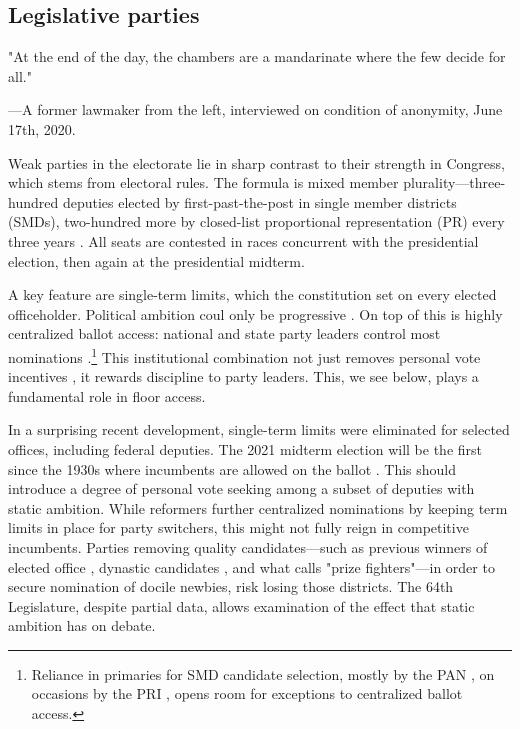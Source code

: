 \documentclass[letter,12pt]{article}
\begin{document}

\subsection{Legislative parties}
\epigraph{\singlespacing "At the end of the day, the chambers are a mandarinate where the few decide for all."}%
{\singlespacing---A former lawmaker from the left, interviewed on condition of anonymity, June 17th, 2020.}

Weak parties in the electorate lie in sharp contrast to their strength in Congress, which stems from electoral rules. The formula is mixed member plurality---three-hundred deputies elected by first-past-the-post in single member districts (SMDs), two-hundred more by closed-list proportional representation (PR) every three years \citep{weldonMixedMemberSys2001}. All seats are contested in races concurrent with the presidential election, then again at the presidential midterm.

A key feature are single-term limits, which the constitution set on every elected officeholder. Political ambition coul only be progressive \citep{schlesinger.1966}. On top of this is highly centralized ballot access: national and state party leaders control most nominations \citep{rosas.langston.2011,langston.2008}.\footnote{Reliance in primaries for SMD candidate selection, mostly by the PAN \citep{ascencio.kerevel.cand-sel-beh.2021}, on occasions by the PRI \citep{poire.phd.2002}, opens room for exceptions to centralized ballot access.} This institutional combination not just removes personal vote incentives \citep{carey.shugart.1995}, it rewards discipline to party leaders. This, we see below, plays a fundamental role in floor access. 

In a surprising recent development, single-term limits were eliminated for selected offices, including federal deputies. The 2021 midterm election will be the first since the 1930s where incumbents are allowed on the ballot \citep[see][ for details]{magarInstReel.2017}. This should introduce a degree of personal vote seeking among a subset of deputies with static ambition. While reformers further centralized nominations by keeping term limits in place for party switchers, this might not fully reign in competitive incumbents. Parties removing quality candidates---such as previous winners of elected office \citep{jacobson.1997}, dynastic candidates \citep{enriquez-dinastias2018itam}, and what \citet{zallerprizeFighters} calls "prize fighters"---in order to secure nomination of docile newbies, risk losing those districts. The 64th Legislature, despite partial data, allows examination of the effect that static ambition has on debate.
\end{document}
